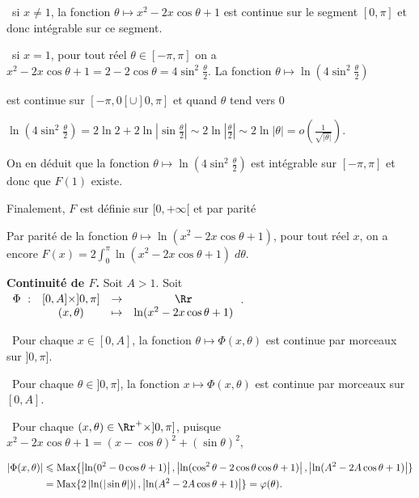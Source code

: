 {\begin{enumerate}
{\textbullet~si $x\neq1$, la fonction $\theta\mapsto x^2-2x\cos\theta+1$ est continue sur le segment $[0,\pi]$ et donc intégrable sur ce segment.

\textbullet~si $x=1$, pour tout réel $\theta\in[-\pi,\pi]$ on a $x^2-2x\cos\theta+1=2-2\cos\theta=4\sin^2\frac{\theta}{2}$. La fonction $\theta\mapsto\ln\left(4\sin^2\frac{\theta}{2}\right)$ 

est continue sur $[-\pi,0[\cup]0,\pi]$ et quand $\theta$ tend vers $0$

\begin{center}
$\ln\left(4\sin^2\frac{\theta}{2}\right)=2\ln2+2\ln\left|\sin\frac{\theta}{2}\right|\sim2\ln\left|\frac{\theta}{2}\right|\sim2\ln|\theta|=o\left(\frac{1}{\sqrt{|\theta|}}\right)$.
\end{center}

On en déduit que la fonction $\theta\mapsto\ln\left(4\sin^2\frac{\theta}{2}\right)$ est intégrable sur $[-\pi,\pi]$ et donc que $F(1)$ existe.

Finalement, $F$ est définie sur $[0,+\infty[$ et par parité

\begin{center}
\end{center}

 Par parité de la fonction $\theta\mapsto\ln(x^2-2x\cos\theta+1)$, pour tout réel $x$, on a encore $F(x)=2\int_{0}^{\pi}\ln(x^2-2x\cos\theta+1)\;d\theta$.

\textbf{Continuité de $F$.} Soit $A>1$. Soit $\begin{array}[t]{cccc}
\Phi~:&[0,A]\times]0,\pi]&\rightarrow&\Rr\\
 &(x,\theta)&\mapsto&\ln(x^2-2x\cos\theta+1)
\end{array}$.

\textbullet~Pour chaque $x\in[0,A]$, la fonction $\theta\mapsto\Phi(x,\theta)$ est continue par morceaux sur $]0,\pi]$.

\textbullet~Pour chaque $\theta\in]0,\pi]$, la fonction $x\mapsto\Phi(x,\theta)$ est continue par morceaux sur $[0,A]$.

\textbullet~Pour chaque $(x,\theta)\in\Rr^+\times]0,\pi]$, puisque $x^2-2x\cos\theta+1=(x-\cos\theta)^2+(\sin\theta)^2$,

\begin{align*}\ensuremath
|\Phi(x,\theta)|&\leqslant\text{Max}\{\left|\ln(0^2-0\cos\theta+1)\right|,\left|\ln(\cos^2\theta-2\cos\theta\cos\theta+1)\right|,\left|\ln(A^2-2A\cos\theta+1)\right|\}\\
 &=\text{Max}\{2\left|\ln(|\sin\theta|)\right|,\left|\ln(A^2-2A\cos\theta+1)\right|\}=\varphi(\theta).
\end{align*}

}
\end{enumerate}}

